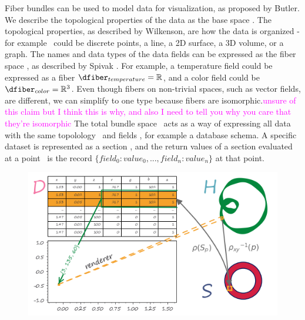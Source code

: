 \documentclass[10pt,journal,compsoc]{IEEEtran}
\newcommand{\note}[1]{\textcolor{magenta}{#1}}
\theoremstyle{definition}
\theoremstyle{remark}
\begin{document}
Fiber bundles can be used to model data for visualization, as proposed by Butler\cite{butlerVectorBundleClassesForm1992, butlerVisualizationModelBased1989}. We describe the topological properties of the data \cite{wilkinsonGrammarGraphics2005} as the base space \dbasec. The topological properties, as described by Wilkenson, are how the data is organized - for example \dbase\ could be discrete points, a line, a 2D surface, a 3D volume, or a graph. The names and data types of the data fields can be expressed as the fiber space \dfiberc, as described by Spivak \cite{spivakDatabasesAreCategories2010,spivakSIMPLICIALDATABASES}. For example, a temperature field could be expressed as a fiber $\dfiber_{temperature}=\mathbb{R}$, and a color field could be $\dfiber_{color}=\mathbb{R}^{3}$. Even though fibers on non-trivial spaces, such as vector fields, are different, we can simplify to one type because fibers are isomorphic.\note{unsure of this claim but I think this is why, and also I need to tell you why you care that they're isomorphic} The total bundle space \dtotalc\ acts as a way of expressing all data with the same topolology \dbasec\ and fields \dfiberc, for example a database schema. A specific dataset is represented as a section \dsectionc, and the return values of a section evaluated at a point \dbasepointc\ is the record $\{field_{0}: value_{0}, ..., field_n:value_n\}$ at that point. 

\begin{figure}
  \label{fig:atct:fb_graphic_bundle}
  \includegraphics[width=1\columnwidth]{render.png}
  \caption{}
\end{figure}
\end{document}

